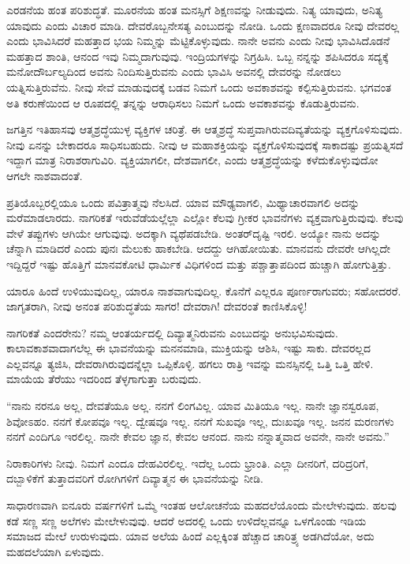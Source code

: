 ಎರಡನೆಯ ಹಂತ ಪರಿಶುದ್ಧತೆ. ಮೂರನೆಯ ಹಂತ ಮನಸ್ಸಿಗೆ ಶಿಕ್ಷಣವನ್ನು ನೀಡುವುದು. ನಿತ್ಯ ಯಾವುದು, ಅನಿತ್ಯ ಯಾವುದು ಎಂದು ವಿಚಾರ ಮಾಡಿ. ದೇವರೊಬ್ಬನೇ\break ಸತ್ಯ ಎಂಬುದನ್ನು ನೋಡಿ. ಒಂದು ಕ್ಷಣವಾದರೂ ನೀವು ದೇವರಲ್ಲ ಎಂದು ಭಾವಿಸಿದರೆ ಮಹತ್ತಾದ ಭಯ ನಿಮ್ಮನ್ನು ಮೆಟ್ಟಿಕೊಳ್ಳುವುದು. ನಾನೇ ಅವನು ಎಂದು ನೀವು ಭಾವಿಸಿದೊಡನೆ ಮಹತ್ತಾದ ಶಾಂತಿ, ಆನಂದ ಇವು ನಿಮ್ಮದಾಗುವುವು. ಇಂದ್ರಿಯಗಳನ್ನು ನಿಗ್ರಹಿಸಿ. ಒಬ್ಬ ನನ್ನನ್ನು ಶಪಿಸಿದರೂ ಸದ್ಯಕ್ಕೆ ಮನೋದೌರ್ಬಲ್ಯದಿಂದ ಅವನು ನಿಂದಿಸುತ್ತಿರುವನು ಎಂದು ಭಾವಿಸಿ ಅವನಲ್ಲಿ ದೇವರನ್ನು ನೋಡಲು ಯತ್ನಿಸುತ್ತಿರುವೆನು. ನೀವು ಸೇವೆ ಮಾಡುವುದಕ್ಕೆ ಬಡವ ನಿಮಗೆ ಒಂದು ಅವಕಾಶವನ್ನು ಕಲ್ಪಿಸುತ್ತಿರುವನು. ಭಗವಂತ ಅತಿ ಕರುಣೆಯಿಂದ ಆ ರೂಪದಲ್ಲಿ ತನ್ನನ್ನು ಆರಾಧಿಸಲು ನಿಮಗೆ ಒಂದು ಅವಕಾಶವನ್ನು ಕೊಡುತ್ತಿರುವನು.

ಜಗತ್ತಿನ ಇತಿಹಾಸವು ಆತ್ಮಶ್ರದ್ಧೆಯುಳ್ಳ ವ್ಯಕ್ತಿಗಳ ಚರಿತ್ರೆ. ಈ ಆತ್ಮಶ್ರದ್ಧೆ ಸುಪ್ತವಾಗಿರುವ\break ದಿವ್ಯತೆಯನ್ನು ವ್ಯಕ್ತಗೊಳಿಸುವುದು. ನೀವು ಏನನ್ನು ಬೇಕಾದರೂ ಸಾಧಿಸಬಹುದು. ನೀವು ಆ ಮಹಾಶಕ್ತಿಯನ್ನು ವ್ಯಕ್ತಗೊಳಿಸುವುದಕ್ಕೆ ಸಾಕಾದಷ್ಟು ಪ್ರಯತ್ನಿಸದೆ ಇದ್ದಾಗ ಮಾತ್ರ ನಿರಾಶರಾಗುವಿರಿ. ವ್ಯಕ್ತಿಯಾಗಲೀ, ದೇಶವಾಗಲೀ, ಎಂದು ಆತ್ಮಶ್ರದ್ಧೆಯನ್ನು ಕಳೆದುಕೊಳ್ಳುವುದೋ ಆಗಲೇ ನಾಶವಾದಂತೆ.

ಪ್ರತಿಯೊಬ್ಬರಲ್ಲಿಯೂ ಒಂದು ಪವಿತ್ರಾತ್ಮವು ನೆಲಸಿದೆ. ಯಾವ ಮೌಢ್ಯವಾಗಲಿ, ಮಿಥ್ಯಾಚಾರವಾಗಲಿ ಅದನ್ನು ಮರೆಮಾಡಲಾರದು. ನಾಗರಿಕತೆ ಇರುವೆಡೆಯಲ್ಲೆಲ್ಲಾ ಎಲ್ಲೋ ಕೆಲವು ಗ್ರೀಕರ ಭಾವನೆಗಳು ವ್ಯಕ್ತವಾಗುತ್ತಿರುವುವು. ಕೆಲವು ವೇಳೆ ತಪ್ಪುಗಳು ಆಗಿಯೇ ಆಗುವುವು. ಅದಕ್ಕಾಗಿ ವ್ಯಥೆಪಡಬೇಡಿ. ಅಂತರ್​ದೃಷ್ಟಿ ಇರಲಿ. ಅಯ್ಯೋ ನಾನು ಅದನ್ನು ಚೆನ್ನಾಗಿ ಮಾಡಿದರೆ ಎಂದು ಪುನಃ ಮೆಲುಕು ಹಾಕಬೇಡಿ. ಆದದ್ದು ಆಗಿಹೋಯಿತು. ಮಾನವನು ದೇವರೇ ಆಗಿಲ್ಲದೇ ಇದ್ದಿದ್ದರೆ ಇಷ್ಟು ಹೊತ್ತಿಗೆ ಮಾನವಕೋಟಿ ಧಾರ್ಮಿಕ ವಿಧಿಗಳಿಂದ ಮತ್ತು ಪಶ್ಚಾತ್ತಾಪದಿಂದ ಹುಚ್ಚಾಗಿ ಹೋಗುತ್ತಿತ್ತು.

ಯಾರೂ ಹಿಂದೆ ಉಳಿಯುವುದಿಲ್ಲ, ಯಾರೂ ನಾಶವಾಗುವುದಿಲ್ಲ. ಕೊನೆಗೆ ಎಲ್ಲರೂ ಪೂರ್ಣರಾಗುವರು; ಸಹೋದರರೆ. ಜಾಗೃತರಾಗಿ, ನೀವು ಅನಂತ ಪರಿಶುದ್ಧತೆಯ ಸಾಗರ! ದೇವರಾಗಿ! ದೇವರಂತೆ ಕಾಣಿಸಿಕೊಳ್ಳಿ!

ನಾಗರಿಕತೆ ಎಂದರೇನು? ನಮ್ಮ ಆಂತರ್ಯದಲ್ಲಿ ದಿವ್ಯಾತ್ಮನಿರುವನು ಎಂಬುದನ್ನು ಅನುಭವಿಸುವುದು. ಕಾಲಾವಕಾಶವಾದಾಗಲೆಲ್ಲ ಈ ಭಾವನೆಯನ್ನು ಮನನಮಾಡಿ, ಮುಕ್ತಿಯನ್ನು ಆಶಿಸಿ, ಇಷ್ಟು ಸಾಕು. ದೇವರಲ್ಲದ ಎಲ್ಲವನ್ನೂ ತ್ಯಜಿಸಿ, ದೇವರಾಗಿರುವುದನ್ನೆಲ್ಲಾ ಒಪ್ಪಿಕೊಳ್ಳಿ. ಹಗಲು ರಾತ್ರಿ ಇವನ್ನು ಮನಸ್ಸಿನಲ್ಲಿ ಒತ್ತಿ ಒತ್ತಿ ಹೇಳಿ. ಮಾಯೆಯ ತೆರೆಯು ಇದರಿಂದ ತೆಳ್ಳಗಾಗುತ್ತಾ ಬರುವುದು.

“ನಾನು ನರನೂ ಅಲ್ಲ, ದೇವತೆಯೂ ಅಲ್ಲ. ನನಗೆ ಲಿಂಗವಿಲ್ಲ. ಯಾವ ಮಿತಿಯೂ ಇಲ್ಲ. ನಾನೇ ಜ್ಞಾನಸ್ವರೂಪ, ಶಿವೋಽಹಂ. ನನಗೆ ಕೋಪವೂ ಇಲ್ಲ. ದ್ವೇಷವೂ ಇಲ್ಲ. ನನಗೆ ಸುಖವೂ ಇಲ್ಲ, ದುಃಖವೂ ಇಲ್ಲ. ಜನನ ಮರಣಗಳು ನನಗೆ ಎಂದಿಗೂ ಇರಲಿಲ್ಲ. ನಾನೇ ಕೇವಲ ಜ್ಞಾನ, ಕೇವಲ ಆನಂದ. ನಾನು ನನ್ನಾತ್ಮವಾದ ಅವನೇ, ನಾನೇ ಅವನು.”

ನಿರಾಕಾರಿಗಳು ನೀವು. ನಿಮಗೆ ಎಂದೂ ದೇಹವಿರಲಿಲ್ಲ. ಇದೆಲ್ಲ ಒಂದು ಭ್ರಾಂತಿ. ಎಲ್ಲಾ ದೀನರಿಗೆ, ದರಿದ್ರರಿಗೆ, ದಬ್ಬಾಳಿಕೆಗೆ ತುತ್ತಾದವರಿಗೆ ರೋಗಿಗಳಿಗೆ ದಿವ್ಯಾತ್ಮನ ಈ ಭಾವನೆಯನ್ನು ನೀಡಿ.

ಸಾಧಾರಣವಾಗಿ ಐನೂರು ವರ್ಷಗಳಿಗೆ ಒಮ್ಮೆ ಇಂತಹ ಆಲೋಚನೆಯ ಮಹದಲೆಯೊಂದು ಮೇಲೇಳುವುದು. ಹಲವು ಕಡೆ ಸಣ್ಣ ಸಣ್ಣ ಅಲೆಗಳು ಮೇಲೇಳುವುವು. ಆದರೆ ಅದರಲ್ಲಿ ಒಂದು ಉಳಿದೆಲ್ಲವನ್ನೂ ಒಳಗೊಂಡು ಇಡಿಯ ಸಮಾಜದ ಮೇಲೆ ಉರುಳುವುದು. ಯಾವ ಅಲೆಯ ಹಿಂದೆ ಎಲ್ಲಕ್ಕಿಂತ ಹೆಚ್ಚಾದ ಚಾರಿತ್ರ್ಯ ಅಡಗಿದೆಯೋ, ಅದು ಮಹದಲೆಯಾಗಿ ಏಳುವುದು.

